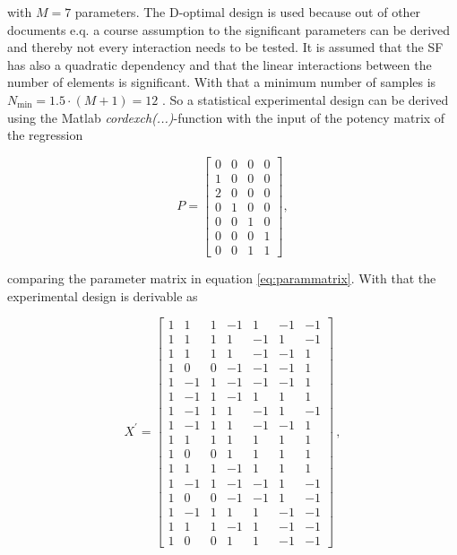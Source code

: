 with $M=7$ parameters. The D-optimal design is used because out of other documents e.q. \cite{2018arXiv180310993F} a course assumption to the significant parameters can be derived and thereby not every interaction needs to be tested. It is assumed that the \ac{SF} has also a quadratic dependency and that the linear interactions between the number of elements is significant. With that a minimum number of samples is $N_\text{min}=1.5\cdot\left(M+1\right)=12$ \cite{dffs}. So a statistical experimental design can be derived using the Matlab\texttrademark{} \textit{cordexch(...)}-function with the input of the potency matrix of the regression

\begin{equation}
P = \begin{bmatrix}
0 & 0 & 0 & 0\\
1 & 0 & 0 & 0\\
2 & 0 & 0 & 0\\
0 & 1 & 0 & 0\\
0 & 0 & 1 & 0\\
0 & 0 & 0 & 1\\
0 & 0 & 1 & 1
\end{bmatrix},
\end{equation}

comparing the parameter matrix in equation \ref{eq:parammatrix}. With that the experimental design is derivable as 

\begin{equation}
X^\prime = \begin{bmatrix}
1&1&1&-1&1&-1&-1\\
1&1&1&1&-1&1&-1\\
1&1&1&1&-1&-1&1\\
1&0&0&-1&-1&-1&1\\
1&-1&1&-1&-1&-1&1\\
1&-1&1&-1&1&1&1\\
1&-1&1&1&-1&1&-1\\
1&-1&1&1&-1&-1&1\\
1&1&1&1&1&1&1\\
1&0&0&1&1&1&1\\
1&1&1&-1&1&1&1\\
1&-1&1&-1&-1&1&-1\\
1&0&0&-1&-1&1&-1\\
1&-1&1&1&1&-1&-1\\
1&1&1&-1&1&-1&-1\\
1&0&0&1&1&-1&-1
\end{bmatrix}\,,
\end{equation}

